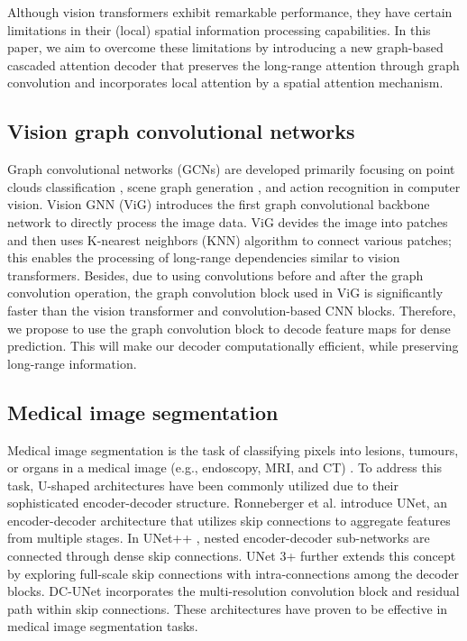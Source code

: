 \documentclass[10pt,twocolumn,letterpaper]{article}
\begin{document}
Although vision transformers exhibit remarkable performance, they have certain limitations in their (local) spatial information processing capabilities. In this paper, we aim to overcome these limitations by introducing a new graph-based cascaded attention decoder that preserves the long-range attention through graph convolution and incorporates local attention by a spatial attention mechanism.

\subsection{Vision graph convolutional networks}
Graph convolutional networks (GCNs) are developed primarily focusing on point clouds classification \cite{landrieu2018large, li2019deepgcns}, scene graph generation \cite{xu2017scene}, and action recognition \cite{yan2018spatial} in computer vision. Vision GNN (ViG) \cite{han2022vision} introduces the first graph convolutional backbone network to directly process the image data. ViG devides the image into patches and then uses K-nearest neighbors (KNN) algorithm to connect various patches; this enables the processing of long-range dependencies similar to vision transformers. Besides, due to using  convolutions before and after the graph convolution operation, the graph convolution block used in ViG is significantly faster than the vision transformer and  convolution-based CNN blocks. Therefore, we propose to use the graph convolution block to decode feature maps for dense prediction. This will make our decoder computationally efficient, while preserving long-range information.  


\subsection{Medical image segmentation}

Medical image segmentation is the task of classifying pixels into lesions, tumours, or organs in a medical image (e.g., endoscopy, MRI, and CT) \cite{chen2021transunet}. To address this task, U-shaped architectures \cite{ronneberger2015u, oktay2018attention, zhou2018unet++, huang2020unet, lou2021dc} have been commonly utilized due to their sophisticated encoder-decoder structure. Ronneberger et al. \cite{huang2020unet} introduce UNet, an encoder-decoder architecture that utilizes skip connections to aggregate features from multiple stages. In UNet++ \cite{zhou2018unet++}, nested encoder-decoder sub-networks are connected through dense skip connections. UNet 3+ \cite{huang2020unet} further extends this concept by exploring full-scale skip connections with intra-connections among the decoder blocks. DC-UNet \cite{lou2021dc} incorporates the multi-resolution convolution block and residual path within skip connections. These architectures have proven to be effective in medical image segmentation tasks.
\end{document}
